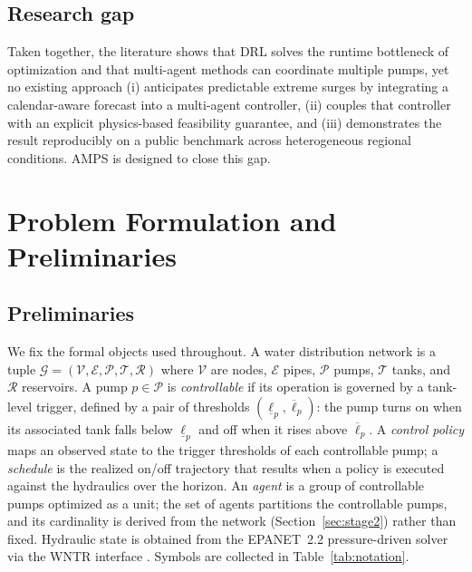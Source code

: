 \documentclass[11pt,a4paper]{article}
\begin{document}
\subsection{Research gap}
Taken together, the literature shows that DRL solves the runtime bottleneck of
optimization and that multi-agent methods can coordinate multiple pumps, yet no
existing approach (i) anticipates predictable extreme surges by integrating a
calendar-aware forecast into a multi-agent controller, (ii) couples that
controller with an explicit physics-based feasibility guarantee, and (iii)
demonstrates the result reproducibly on a public benchmark across heterogeneous
regional conditions. AMPS is designed to close this gap.

\section{Problem Formulation and Preliminaries}
\label{sec:problem}

\subsection{Preliminaries}
\label{sec:prelim}
We fix the formal objects used throughout. A water distribution network is a tuple
$\mathcal{G} = (\mathcal{V}, \mathcal{E}, \mathcal{P}, \mathcal{T},
\mathcal{R})$ where $\mathcal{V}$ are nodes, $\mathcal{E}$ pipes,
$\mathcal{P}$ pumps, $\mathcal{T}$ tanks, and $\mathcal{R}$ reservoirs. A pump
$p\in\mathcal{P}$ is \emph{controllable} if its operation is governed by a
tank-level trigger, defined by a pair of thresholds
$(\underline{\ell}_p, \overline{\ell}_p)$: the pump turns on when its associated
tank falls below $\underline{\ell}_p$ and off when it rises above
$\overline{\ell}_p$. A \emph{control policy} maps an observed state to the trigger
thresholds of each controllable pump; a \emph{schedule} is the realized on/off
trajectory that results when a policy is executed against the hydraulics over the
horizon. An \emph{agent} is a group of controllable pumps optimized as a unit; the
set of agents partitions the controllable pumps, and its cardinality is derived
from the network (Section~\ref{sec:stage2}) rather than fixed. Hydraulic state is
obtained from the EPANET~2.2 pressure-driven solver \citep{Rossman2000EPANET} via
the WNTR interface \citep{Klise2017WNTR}. Symbols are collected in
Table~\ref{tab:notation}.
\end{document}
